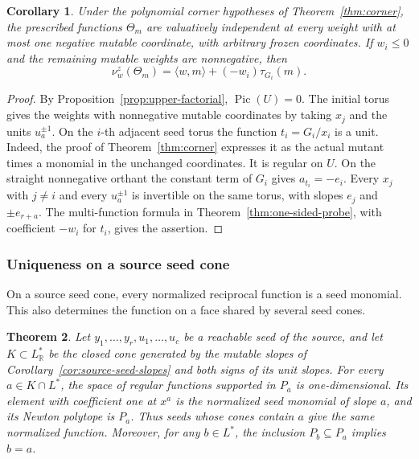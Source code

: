 \documentclass[11pt,reqno]{amsart}
\numberwithin{equation}{section}
\newtheorem{theorem}{Theorem}[section]
\newtheorem{corollary}[theorem]{Corollary}
\theoremstyle{definition}
\theoremstyle{remark}
\DeclareMathOperator{\Pic}{Pic}
\begin{document}
\begin{corollary}\label{cor:one-negative-probe}
Under the polynomial corner hypotheses of Theorem~\ref{thm:corner},
the prescribed functions \(\Theta_m\) are valuatively independent at
every weight with at most one negative mutable coordinate, with
arbitrary frozen coordinates. If \(w_i\le0\) and the remaining mutable
weights are nonnegative, then
\[ \nu^z_w(\Theta_m)=\langle w,m\rangle+(-w_i)\tau_{G_i}(m). \]
\end{corollary}
\begin{proof}
By Proposition~\ref{prop:upper-factorial}, \(\Pic(U)=0\).
The initial torus gives the weights with nonnegative
mutable coordinates by taking \(x_j\) and the units \(u_a^{\pm1}\).
On the \(i\)-th adjacent seed torus the function \(t_i=G_i/x_i\)
is a unit. Indeed, the proof of Theorem~\ref{thm:corner} expresses it
as the actual mutant times a monomial in the unchanged coordinates.
It is regular on \(U\). On the straight nonnegative orthant the
constant term of \(G_i\) gives \(a_{t_i}=-e_i\). Every \(x_j\) with
\(j\ne i\) and every \(u_a^{\pm1}\) is invertible on the same torus,
with slopes \(e_j\) and \(\pm e_{r+a}\). The multi-function formula
in Theorem~\ref{thm:one-sided-probe}, with coefficient \(-w_i\)
for \(t_i\), gives the assertion.
\end{proof}

\subsubsection{Uniqueness on a source seed cone}

On a source seed cone, every normalized reciprocal function is a
seed monomial. This also determines the function on a face shared by
several seed cones.

\begin{theorem}\label{thm:seed-windows}
Let \(y_1,\ldots,y_r,u_1,\ldots,u_c\) be a reachable seed of the
source, and let \(K\subset L^*_{\mathbb R}\) be the closed cone generated
by the mutable slopes of Corollary~\ref{cor:source-seed-slopes} and both
signs of its unit slopes. For every \(a\in K\cap L^*\), the space of regular functions supported
in \(P_a\) is one-dimensional. Its element with coefficient one at \(x^a\) is
the normalized seed monomial of slope \(a\), and its Newton polytope is
\(P_a\). Thus seeds whose cones contain \(a\) give the same normalized
function. Moreover, for any \(b\in L^*\), the inclusion
\(P_b\subseteq P_a\) implies \(b=a\).
\end{theorem}
\end{document}
